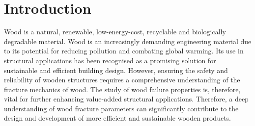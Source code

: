 \documentclass[3p,times,procedia]{elsarticle}
\begin{document}

\section{Introduction}\label{S:intro}

Wood is a natural, renewable, low-energy-cost, recyclable and biologically degradable material. Wood is an increasingly demanding engineering material due to its potential for reducing pollution and combating global warming. Its use in structural applications has been recognised as a promising solution for sustainable and efficient building design. However, ensuring the safety and reliability of wooden structures requires a comprehensive understanding of the fracture mechanics of wood. The study of wood failure properties is, therefore, vital for further enhancing value-added structural applications. Therefore, a deep understanding of wood fracture parameters can significantly contribute to the design and development of more efficient and sustainable wooden products.
\end{document}
